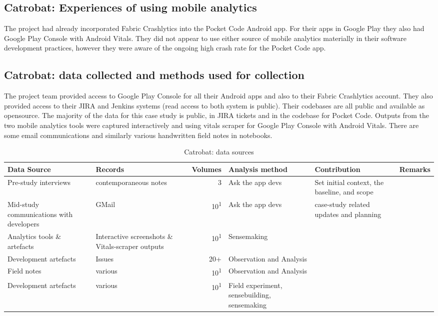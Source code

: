 \subsection{Catrobat: Experiences of using mobile analytics}
The project had already incorporated Fabric Crashlytics into the Pocket Code Android app. %
For their apps in Google Play they also had Google Play Console with Android Vitals. They did not appear to use either source of mobile analytics materially in their software development practices, however they were aware of the ongoing high crash rate for the Pocket Code app. %

\subsection{Catrobat: data collected and methods used for collection}
The project team provided access to Google Play Console for all their Android apps and also to their Fabric Crashlytics account. They also provided access to their JIRA and Jenkins systems (read access to both system is public). Their codebases are all public and available as opensource. The majority of the data for this case study is public, in JIRA tickets and in the codebase for Pocket Code. Outputs from the two mobile analytics tools were captured interactively and using vitals scraper for Google Play Console with Android Vitals. There are some email communications and similarly various handwritten field notes in notebooks.


\begin{table*}
    \centering
    \footnotesize
    \tabcolsep=0.12cm
    \begin{tabular}{p{2.4cm}p{2.4cm}r>{\raggedright}p{2.4cm}>{\raggedright}p{3cm}>{\raggedright\arraybackslash}p{2.5cm}}
        Data Source & Records & Volumes & Analysis method & Contribution & Remarks \\
        \toprule
         Pre-study interviews & contemporaneous notes\footnotemark & 3 & Ask the app devs & Set initial context, the baseline, and scope &  \\
         Mid-study communications with developers & GMail & 10\textsuperscript{1} & Ask the app devs & case-study related updates and planning &  \\
         Analytics tools \& artefacts & Interactive screenshots \& Vitals-scraper outputs &10\textsuperscript{1} & Sensemaking &  &  \\
         Development artefacts & Issues & 20+ & Observation and Analysis & & \\
         Field notes & various & 10\textsuperscript{1} & Observation and Analysis & & \\
         Development artefacts & various\footnotemark & 10\textsuperscript{1} & Field experiment, sensebuilding, sensemaking & & \\
         \bottomrule
    \end{tabular}
    \caption{Catrobat: data sources}
    \label{tab:catrobat-data-sources}
\end{table*}

